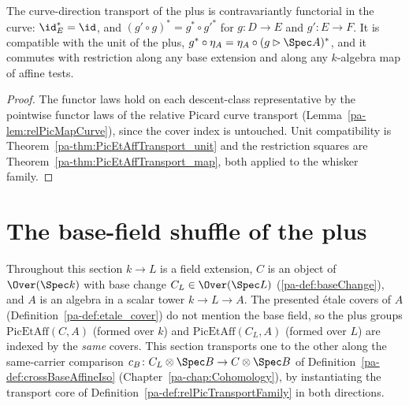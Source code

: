 \begin{theorem}
  \label{pa-thm:PicEtAff_curveMap_laws}
  \leanok

  The curve-direction transport of the plus is contravariantly functorial in the curve:
  \(\id_E^{*} = \id\), and \((g' \circ g)^{*} = g^{*} \circ g'^{*}\) for
  \(g \colon D \to E\) and \(g' \colon E \to F\). It is compatible with the unit of the
  plus, \(g^{*} \circ \eta_A = \eta_A \circ (g \rhd \Spec A)^{*}\), and it commutes with
  restriction along any base extension and along any \(k\)-algebra map of affine tests.
\end{theorem}
\begin{proof}
  \leanok
  The functor laws hold on each descent-class representative by the pointwise functor laws
  of the relative Picard curve transport (Lemma~\ref{pa-lem:relPicMapCurve}), since the cover
  index is untouched. Unit compatibility is Theorem~\ref{pa-thm:PicEtAffTransport_unit} and
  the restriction squares are Theorem~\ref{pa-thm:PicEtAffTransport_map}, both applied to the
  whisker family.
\end{proof}

\section{The base-field shuffle of the plus}
\label{pa-sec:PicEtAffBaseFieldShuffle}

Throughout this section \(k \to L\) is a field extension, \(C\) is an object of
\(\Over(\Spec k)\) with base change \(C_L \in \Over(\Spec L)\) (\ref{pa-def:baseChange}),
and \(A\) is an algebra in a scalar tower \(k \to L \to A\). The presented \'etale
covers of \(A\) (Definition~\ref{pa-def:etale_cover}) do not mention the base field, so the
plus groups \(\mathrm{PicEtAff}(C, A)\) (formed over \(k\)) and
\(\mathrm{PicEtAff}(C_L, A)\) (formed over \(L\)) are indexed by the \emph{same} covers.
This section transports one to the other along the same-carrier comparison
\(c_B \colon C_L \otimes \Spec B \to C \otimes \Spec B\) of
Definition~\ref{pa-def:crossBaseAffineIso} (Chapter~\ref{pa-chap:Cohomology}), by
instantiating the transport core of Definition~\ref{pa-def:relPicTransportFamily} in both
directions.

